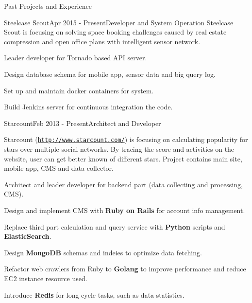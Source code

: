 \documentclass{resume} %
\newcommand{\http}{http:/\hspace{-0.3ex}/}
\begin{document}
\begin{rSection}{Past Projects and Experience}



\begin{rSubsection}{Steelcase Scout}{Apr 2015 - Present}{Developer and System Operation}{}
Steelcase Scout is focusing on solving space booking challenges caused by real estate compression and open office plans with intelligent sensor network.

\begin{rSubsectionList}
\item Leader developer for Tornado based API server.
\item Design database schema for mobile app, sensor data and big query log.
\item Set up and maintain docker containers for system.
\item Build Jenkins server for continuous integration the code.
\end{rSubsectionList}
\end{rSubsection}



\begin{rSubsection}{Starcount}{Feb 2013 - Present}{Architect and Developer}{}

Starcount (\href{http://www.starcount.com/}{\tt \http{}www.starcount.com/}) is focusing on calculating popularity for stars over multiple social networks. By tracing the score and activities on the website, user can get better known of different stars. Project contains main site, mobile app, CMS and data collector.

\begin{rSubsectionList}
\item Architect and leader developer for backend part (data collecting and processing, CMS).
\item Design and implement CMS with \textbf{Ruby on Rails} for account info management.
\item Replace third part calculation and query service with \textbf{Python} scripts and \textbf{ElasticSearch}.
\item Design \textbf{MongoDB} schemas and indeies to optimize data fetching.
\item Refactor web crawlers from Ruby to \textbf{Golang} to improve performance and reduce EC2 instance resource used.
\item Introduce \textbf{Redis} for long cycle tasks, such as data statistics.
\end{rSubsectionList}
\end{rSubsection}




\end{rSection}
\end{document}
